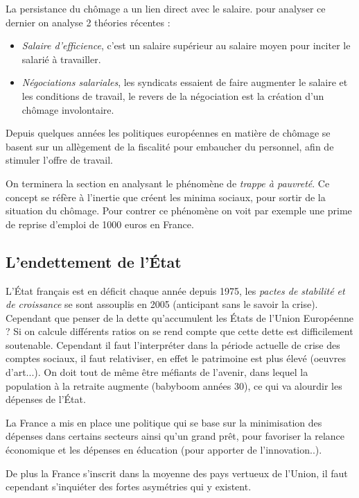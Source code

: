 La persistance du chômage a un lien direct avec le salaire. pour analyser ce dernier on analyse 2 théories récentes : 
\begin{itemize}
	\item \emph{Salaire d'efficience}, c'est un salaire supérieur au salaire moyen pour inciter le salarié à travailler.
	\item \emph{Négociations salariales}, les syndicats essaient de faire augmenter le salaire et les conditions de travail, le revers de la négociation 
	est la création d'un chômage involontaire.
\end{itemize}
Depuis quelques années les politiques européennes en matière de chômage se basent sur un allègement de la fiscalité pour embaucher du personnel, afin 
de stimuler l'offre de travail.

On terminera la section en analysant le phénomène de \emph{trappe à pauvreté}. Ce concept se réfère à l'inertie que créent les minima sociaux, pour sortir de
la situation du chômage. Pour contrer ce phénomène on voit par exemple une prime de reprise d'emploi de 1000 euros en France.

\subsection{L'endettement de l'État} %
\label{sub:l_endettement_de_l_etat}

L'État français est en déficit chaque année depuis 1975, les \emph{ pactes de stabilité et de croissance} se sont assouplis en 2005 (anticipant sans le savoir la crise).
Cependant que penser de la dette qu'accumulent les États de l'Union Européenne ? Si on calcule différents ratios on se rend compte que cette dette est 
difficilement soutenable. Cependant il faut l'interpréter dans la période actuelle de crise des comptes sociaux, il faut relativiser, en effet le patrimoine
est plus élevé (oeuvres d'art...). On doit tout de même être méfiants de l'avenir, dans lequel la population à la retraite augmente (babyboom années 30), ce qui va alourdir les dépenses de l'État.

La France a mis en place une politique qui se base sur la minimisation des dépenses dans certains secteurs ainsi qu'un grand prêt, pour favoriser la relance 
économique et les dépenses en éducation (pour apporter de l'innovation..). 

De plus la France s'inscrit dans la moyenne des pays vertueux de l'Union, il faut cependant s'inquiéter des fortes asymétries qui y existent.



